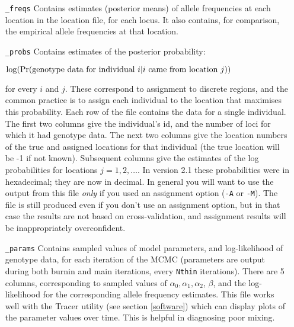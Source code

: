 \documentclass[10pt,titlepage,times,letterpaper]{article}
\def \Pr{{\rm Pr}}
\begin{document}
\begin{enumerate}[\_params]
\item[{\tt \_freqs}] Contains estimates (posterior means) of allele
frequencies at each location in the location file, for each locus. It also contains,
for comparison, the empirical allele frequencies at that location.

\item[{\tt \_probs}] Contains estimates of the posterior probability:

$\log(\Pr(\text{genotype
data for individual $i$} | \text{$i$ came from location $j$}))$ 

for every $i$ and $j$. These correspond to assignment to discrete
regions, and the common practice is to assign each individual
to the location that maximises this probability. Each row of the file
contains the data for a single individual. The first two columns give
the individual's id, and the number of loci for which it had genotype
data.  The next two columns give the location numbers of the
true and assigned locations for that individual (the true location
will be -1 if not known).
Subsequent columns give the estimates of the log
probabilities for locations $j=1,2,\dots$.  In version 2.1
these probabilities were in hexadecimal; they are now in decimal.
In general you will want to
use the output from this file {\it only} if you used an
assignment option ({\tt -A} or {\tt -M}).
The file is still produced even if you
don't use an assignment option, but in that case the results are not
based on cross-validation, and assignment results will be
inappropriately overconfident.

\item[{\tt \_params}] Contains sampled values of model parameters, and
log-likelihood of genotype data, for each iteration of the MCMC
(parameters are output during both burnin and main iterations, every
{\tt Nthin} iterations). There are 5 columns, corresponding to sampled
values of $\alpha_0, \alpha_1, \alpha_2$, $\beta$, and the
log-likelihood for the corresponding allele frequency estimates.
This file works well with the Tracer utility (see section \ref{software}) 
which can display plots of the parameter values over time.  This is helpful in diagnosing poor mixing.


\end{enumerate}
\end{document}
